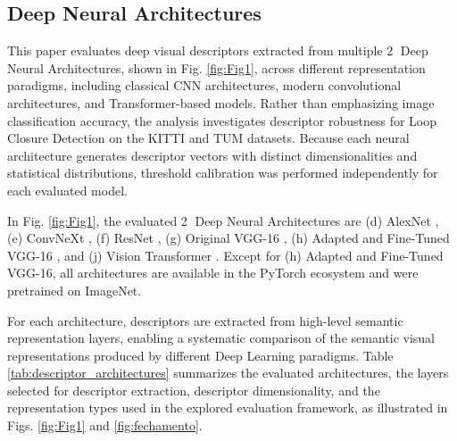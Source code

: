 \documentclass{ieeeaccess}
\newcommand{\circled}[1]{\textcircled{\scriptsize #1}}
\begin{document}
\subsection{Deep Neural Architectures}

This paper evaluates deep visual descriptors extracted from multiple \circled{2} Deep Neural Architectures, shown in Fig. \ref{fig:Fig1}, across different representation paradigms, including classical CNN architectures, modern convolutional architectures, and Transformer-based models. Rather than emphasizing image classification accuracy, the analysis investigates descriptor robustness for Loop Closure Detection on the KITTI and TUM datasets. Because each neural architecture generates descriptor vectors with distinct dimensionalities and statistical distributions, threshold calibration was performed independently for each evaluated model.

In Fig. \ref{fig:Fig1}, the evaluated \circled{2} Deep Neural Architectures are (d) AlexNet \cite{Krizhevsky2017AlexNetCACM}, (e) ConvNeXt \cite{Liu2022ConvNeXt}, (f) ResNet \cite{He2016ResNet}, (g) Original VGG-16 \cite{Simonyan2015VGG}, (h) Adapted and Fine-Tuned VGG-16 \cite{Iegawa2023LoopClosureCNN}, and (j) Vision Transformer \cite{Dosovitskiy2021ViT}. Except for (h) Adapted and Fine-Tuned VGG-16, all architectures are available in the PyTorch ecosystem and were pretrained on ImageNet.

For each architecture, descriptors are extracted from high-level semantic representation layers, enabling a systematic comparison of the semantic visual representations produced by different Deep Learning paradigms. Table \ref{tab:descriptor_architectures} summarizes the evaluated architectures, the layers selected for descriptor extraction, descriptor dimensionality, and the representation types used in the explored evaluation framework, as illustrated in Figs. \ref{fig:Fig1} and \ref{fig:fechamento}.
\end{document}
